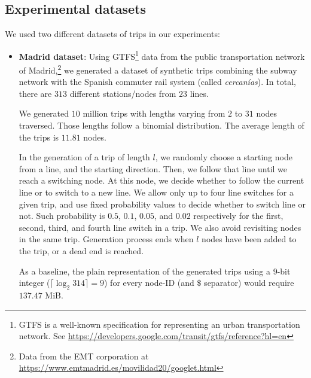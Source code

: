	\subsection{Experimental datasets}
	\label{sec:ed}
	We used two different datasets of trips in our experiments:
	\begin{itemize}
	  \item {\bf Madrid dataset}:
	  Using GTFS\footnote{GTFS is a well-known specification for representing an urban transportation network. See
	  \url{https://developers.google.com/transit/gtfs/reference?hl=en}} data from the  public transportation network of 
	  {Madrid},\footnote{Data from
	  the EMT corporation at \url{https://www.emtmadrid.es/movilidad20/googlet.html}} we generated a dataset of 
	  synthetic trips combining the subway network with the Spanish commuter rail system (called {\em cercanías}).
	  In total, there are $313$ different stations/nodes from $23$ lines.
	 
	We generated $10$ million trips with lengths varying from $2$ to $31$ nodes traversed. Those lengths follow a binomial 
	distribution. The average length of the trips is $11.81$ nodes. 

	In the generation of a trip of length $l$, we randomly choose a starting node from a line, and the starting direction. 
	Then, we follow that line until we reach a switching node. At this node, we decide whether to follow the current 
	line or to switch to a new line. We allow only up to four line switches for a given trip, and use fixed probability 
	values to decide whether to switch line or not. Such probability is $0.5$, $0.1$, $0.05$, and $0.02$ respectively 
	for the first, second, third, and fourth line switch in a trip. 
	We also avoid revisiting nodes in the same trip. 
	Generation process ends when $l$ nodes have been added to the trip, or a dead end is reached.

	As a baseline, the plain representation of the generated trips using a $9$-bit integer ($\lceil\log_2 314\rceil= 9$) 
	for every node-ID (and $\$$ separator) would require $137.47$ MiB.


\end{itemize}
